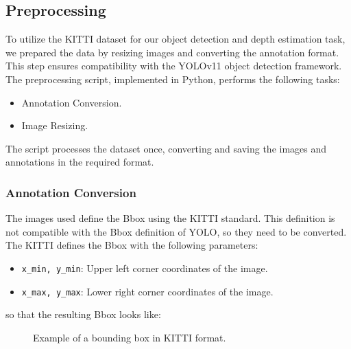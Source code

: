 \documentclass[a4paper,twocolumn]{article}
\begin{document}
\subsection{Preprocessing}

To utilize the \ac{KITTI} dataset for our object detection and depth estimation task, we prepared the data by resizing images and converting the annotation format. This step ensures compatibility with the \ac{YOLO}v11 object detection framework. The preprocessing script, implemented in Python, performs the following tasks:

\begin{itemize}
    \item Annotation Conversion.
    \item Image Resizing.
\end{itemize}

The script processes the dataset once, converting and saving the images and annotations in the required format.

\subsubsection{Annotation Conversion}

The images used define the \ac{Bbox} using the \ac{KITTI} standard. This definition is not compatible with the \ac{Bbox} definition of YOLO, so they need to be converted. The \ac{KITTI} defines the \ac{Bbox} with the following parameters:
\begin{itemize}
    \item \texttt{x\_min, y\_min}: Upper left corner coordinates of the image.
    \item \texttt{x\_max, y\_max}: Lower right corner coordinates of the image.
\end{itemize}
so that the resulting \ac{Bbox} looks like:
\begin{figure}[H]
    \centering
    \caption{Example of a bounding box in KITTI format.}
\end{figure}
\end{document}

